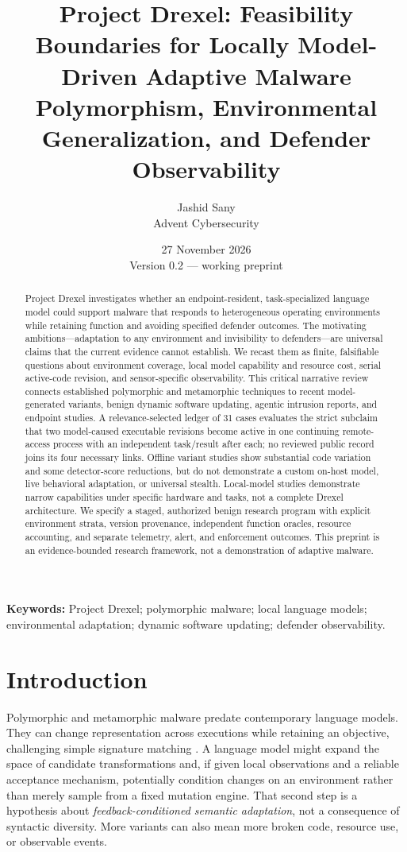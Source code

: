 \documentclass[11pt,letterpaper]{article}
\title{Project Drexel: Feasibility Boundaries for Locally Model-Driven Adaptive Malware\\
\large Polymorphism, Environmental Generalization, and Defender Observability}
\author{Jashid Sany\\\small Advent Cybersecurity}
\date{27 November 2026\\Version 0.2 --- working preprint}
\begin{document}
\maketitle

\begin{abstract}
Project Drexel investigates whether an endpoint-resident, task-specialized language model could support malware that responds to heterogeneous operating environments while retaining function and avoiding specified defender outcomes. The motivating ambitions---adaptation to any environment and invisibility to defenders---are universal claims that the current evidence cannot establish. We recast them as finite, falsifiable questions about environment coverage, local model capability and resource cost, serial active-code revision, and sensor-specific observability. This critical narrative review connects established polymorphic and metamorphic techniques to recent model-generated variants, benign dynamic software updating, agentic intrusion reports, and endpoint studies. A relevance-selected ledger of 31 cases evaluates the strict subclaim that two model-caused executable revisions become active in one continuing remote-access process with an independent task/result after each; no reviewed public record joins its four necessary links. Offline variant studies show substantial code variation and some detector-score reductions, but do not demonstrate a custom on-host model, live behavioral adaptation, or universal stealth. Local-model studies demonstrate narrow capabilities under specific hardware and tasks, not a complete Drexel architecture. We specify a staged, authorized benign research program with explicit environment strata, version provenance, independent function oracles, resource accounting, and separate telemetry, alert, and enforcement outcomes. This preprint is an evidence-bounded research framework, not a demonstration of adaptive malware.
\end{abstract}

\noindent\textbf{Keywords:} Project Drexel; polymorphic malware; local language models; environmental adaptation; dynamic software updating; defender observability.

\section{Introduction}

Polymorphic and metamorphic malware predate contemporary language models. They can change representation across executions while retaining an objective, challenging simple signature matching \cite{mitrepoly,waveatlas}. A language model might expand the space of candidate transformations and, if given local observations and a reliable acceptance mechanism, potentially condition changes on an environment rather than merely sample from a fixed mutation engine. That second step is a hypothesis about \emph{feedback-conditioned semantic adaptation}, not a consequence of syntactic diversity. More variants can also mean more broken code, resource use, or observable events.
\end{document}
